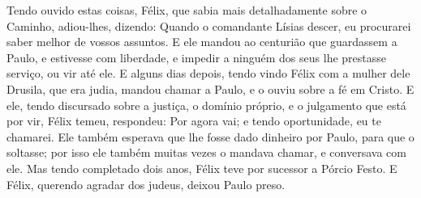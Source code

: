 {  Tendo ouvido estas coisas, Félix, que sabia mais detalhadamente sobre o Caminho, adiou-lhes, dizendo: Quando o comandante Lísias descer, eu procurarei saber melhor de vossos assuntos.
  E ele mandou ao centurião que guardassem a Paulo, e estivesse com
{} liberdade, e impedir a ninguém dos seus
{} lhe prestasse serviço, ou vir até ele.
  E alguns dias depois, tendo vindo Félix com a mulher dele Drusila, que era judia, mandou chamar a Paulo, e o ouviu sobre a fé em Cristo.
  E ele, tendo discursado sobre a justiça, o domínio próprio, e o julgamento que está por vir, Félix temeu,
{} respondeu: Por agora vai; e tendo
{} oportunidade, eu te chamarei.
  Ele também esperava que lhe fosse dado
{} dinheiro por Paulo, para que o soltasse; por isso ele também muitas vezes o mandava chamar, e conversava com ele.
  Mas tendo completado dois anos, Félix teve por sucessor a Pórcio Festo. E Félix, querendo agradar dos judeus, deixou Paulo preso.
\par }

